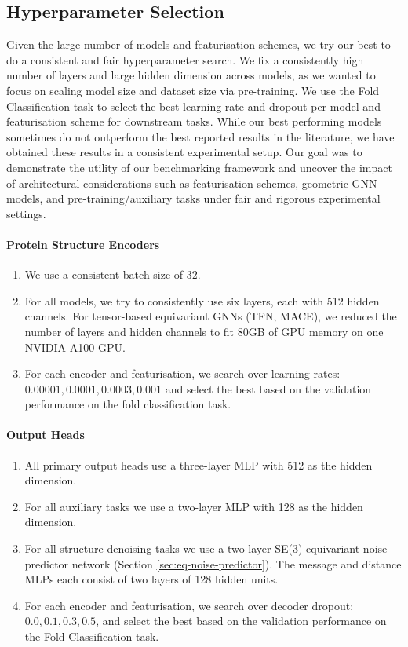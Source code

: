 
\subsection{Hyperparameter Selection}
\label{app:hyperparameters}

Given the large number of models and featurisation schemes, we try our best to do a consistent and fair hyperparameter search.
We fix a consistently high number of layers and large hidden dimension across models, as we wanted to focus on scaling model size and dataset size via pre-training.
We use the Fold Classification task to select the best learning rate and dropout per model and featurisation scheme for downstream tasks. 
While our best performing models sometimes do not outperform the best reported results in the literature, we have obtained these results in a consistent experimental setup. 
Our goal was to demonstrate the utility of our benchmarking framework and uncover the impact of architectural considerations such as featurisation schemes, geometric GNN models, and pre-training/auxiliary tasks under fair and rigorous experimental settings.

\paragraph{Protein Structure Encoders}
\begin{enumerate}
    \item We use a consistent batch size of 32.
    \item For all models, we try to consistently use six layers, each with 512 hidden channels. For tensor-based equivariant GNNs (TFN, MACE), we reduced the number of layers and hidden channels to fit 80GB of GPU memory on one NVIDIA A100 GPU.
    \item For each encoder and featurisation, we search over learning rates: $0.00001, 0.0001, 0.0003, 0.001$ and select the best based on the validation performance on the fold classification task.
\end{enumerate}

\paragraph{Output Heads}
\begin{enumerate}
    \item All primary output heads use a three-layer MLP with 512 as the hidden dimension.
    \item For all auxiliary tasks we use a two-layer MLP with 128 as the hidden dimension.
    \item For all structure denoising tasks we use a two-layer SE(3) equivariant noise predictor network (Section \ref{sec:eq-noise-predictor}). The message and distance MLPs each consist of two layers of 128 hidden units.
    \item For each encoder and featurisation, we search over decoder dropout: $0.0, 0.1, 0.3, 0.5$, and select the best based on the validation performance on the Fold Classification task.
    
\end{enumerate}

